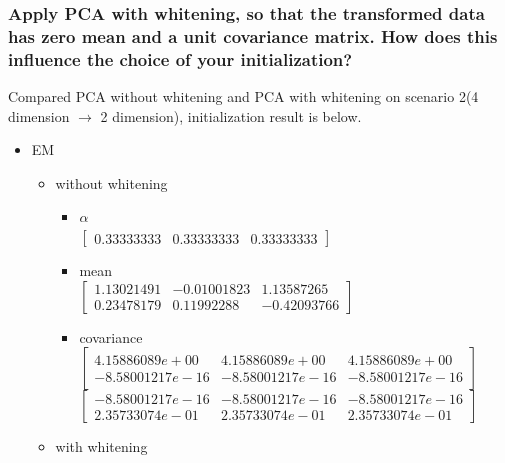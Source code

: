 \documentclass[a4paper]{article}
\begin{document}
	\subsubsection{Apply PCA with whitening, so that the transformed data has zero mean and a unit covariance matrix. How does this influence the choice of your initialization?}
        Compared PCA without whitening and PCA with whitening on scenario 2(4 dimension $\rightarrow$ 2 dimension), initialization result is below.
        \begin{itemize}
          \item EM
            \begin{itemize}
              \item without whitening
                \begin{itemize}
                  \item $\alpha$ \\ $ \begin{bmatrix}
                      0.33333333 & 0.33333333 & 0.33333333
                  \end{bmatrix}  $
                \item mean \\ $ \begin{bmatrix}
                    1.13021491 & -0.01001823 & 1.13587265 \\
                    0.23478179 & 0.11992288 & -0.42093766
                \end{bmatrix}  $
              \item covariance \\ $ \begin{bmatrix}
                  4.15886089e+00 & 4.15886089e+00 & 4.15886089e+00 \\
                  -8.58001217e-16 & -8.58001217e-16 & -8.58001217e-16
              \end{bmatrix}  $ \\ $ \begin{bmatrix}
                -8.58001217e-16 & -8.58001217e-16 & -8.58001217e-16 \\
                2.35733074e-01 & 2.35733074e-01 & 2.35733074e-01
              \end{bmatrix}  $
                \end{itemize}
              \item with whitening
                \begin{itemize}
                  \item $\alpha$ \\ $ \begin{bmatrix}

\end{bmatrix}
\end{itemize}
\end{itemize}
\end{itemize}
\end{document}

